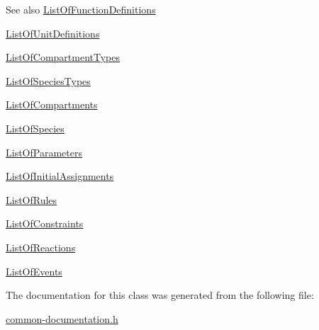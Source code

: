 \begin{DoxySeeAlso}{See also}
\hyperlink{class_list_of_function_definitions}{List\+Of\+Function\+Definitions} 

\hyperlink{class_list_of_unit_definitions}{List\+Of\+Unit\+Definitions} 

\hyperlink{class_list_of_compartment_types}{List\+Of\+Compartment\+Types} 

\hyperlink{class_list_of_species_types}{List\+Of\+Species\+Types} 

\hyperlink{class_list_of_compartments}{List\+Of\+Compartments} 

\hyperlink{class_list_of_species}{List\+Of\+Species} 

\hyperlink{class_list_of_parameters}{List\+Of\+Parameters} 

\hyperlink{class_list_of_initial_assignments}{List\+Of\+Initial\+Assignments} 

\hyperlink{class_list_of_rules}{List\+Of\+Rules} 

\hyperlink{class_list_of_constraints}{List\+Of\+Constraints} 

\hyperlink{class_list_of_reactions}{List\+Of\+Reactions} 

\hyperlink{class_list_of_events}{List\+Of\+Events} 
\end{DoxySeeAlso}


The documentation for this class was generated from the following file\+:\begin{DoxyCompactItemize}
\item 
\hyperlink{common-documentation_8h}{common-\/documentation.\+h}\end{DoxyCompactItemize}
